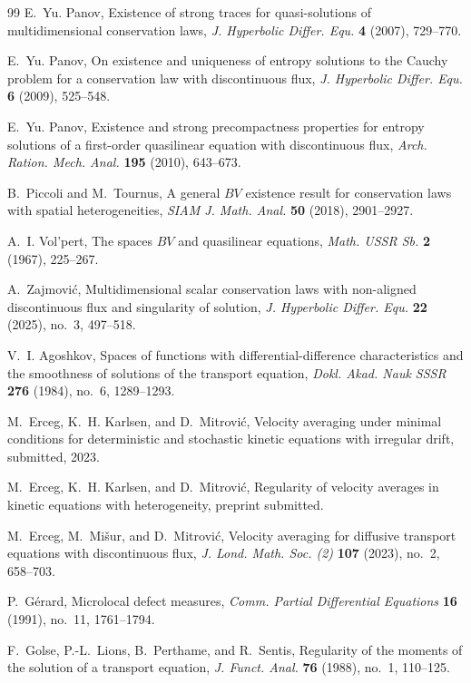 \documentclass[11pt]{amsart}
\numberwithin{equation}{section}
\theoremstyle{plain}
\theoremstyle{definition}
\theoremstyle{remark}
\begin{document}
\begin{thebibliography}{99}
E.~Yu. Panov,
Existence of strong traces for quasi-solutions of multidimensional conservation laws,
\emph{J. Hyperbolic Differ. Equ.} \textbf{4} (2007), 729--770.

E.~Yu. Panov,
On existence and uniqueness of entropy solutions to the Cauchy problem for a conservation law with discontinuous flux,
\emph{J. Hyperbolic Differ. Equ.} \textbf{6} (2009), 525--548.

E.~Yu. Panov,
Existence and strong precompactness properties for entropy solutions of a first-order quasilinear equation with discontinuous flux,
\emph{Arch. Ration. Mech. Anal.} \textbf{195} (2010), 643--673.

B.~Piccoli and M.~Tournus,
A general \(BV\) existence result for conservation laws with spatial heterogeneities,
\emph{SIAM J. Math. Anal.} \textbf{50} (2018), 2901--2927.

A.~I. Vol'pert,
The spaces \(BV\) and quasilinear equations,
\emph{Math. USSR Sb.} \textbf{2} (1967), 225--267.

A.~Zajmovi\'c,
Multidimensional scalar conservation laws with non-aligned discontinuous flux and singularity of solution,
\emph{J. Hyperbolic Differ. Equ.} \textbf{22} (2025), no.~3, 497--518.

V.~I. Agoshkov,
Spaces of functions with differential-difference characteristics and the smoothness of solutions of the transport equation,
\emph{Dokl. Akad. Nauk SSSR} \textbf{276} (1984), no.~6, 1289--1293.

M.~Erceg, K.~H. Karlsen, and D.~Mitrovi\'c,
Velocity averaging under minimal conditions for deterministic and stochastic kinetic equations with irregular drift,
submitted, 2023.

M.~Erceg, K.~H. Karlsen, and D.~Mitrovi\'c,
Regularity of velocity averages in kinetic equations with heterogeneity,
preprint submitted.

M.~Erceg, M.~Mi\v{s}ur, and D.~Mitrovi\'c,
Velocity averaging for diffusive transport equations with discontinuous flux,
\emph{J. Lond. Math. Soc. (2)} \textbf{107} (2023), no.~2, 658--703.

P.~G\'erard,
Microlocal defect measures,
\emph{Comm. Partial Differential Equations} \textbf{16} (1991), no.~11, 1761--1794.

F.~Golse, P.-L.~Lions, B.~Perthame, and R.~Sentis,
Regularity of the moments of the solution of a transport equation,
\emph{J. Funct. Anal.} \textbf{76} (1988), no.~1, 110--125.


\end{thebibliography}
\end{document}
